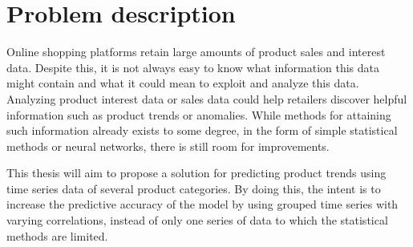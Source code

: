 
\section{Problem description}
\label{section:Introduction:ProblemDescription}
Online shopping platforms retain large amounts of product sales and interest data.
Despite this, it is not always easy to know what information this data might contain and what it could mean to exploit and analyze this data.
Analyzing product interest data or sales data could help retailers discover helpful information such as product trends or anomalies.
While methods for attaining such information already exists to some degree, in the form of simple statistical methods or neural networks,
there is still room for improvements.


This thesis will aim to propose a solution for predicting product trends using time series data of several product categories.
By doing this, the intent is to increase the predictive accuracy of the model by using grouped time series with varying correlations,
instead of only one series of data to which the statistical methods are limited.
